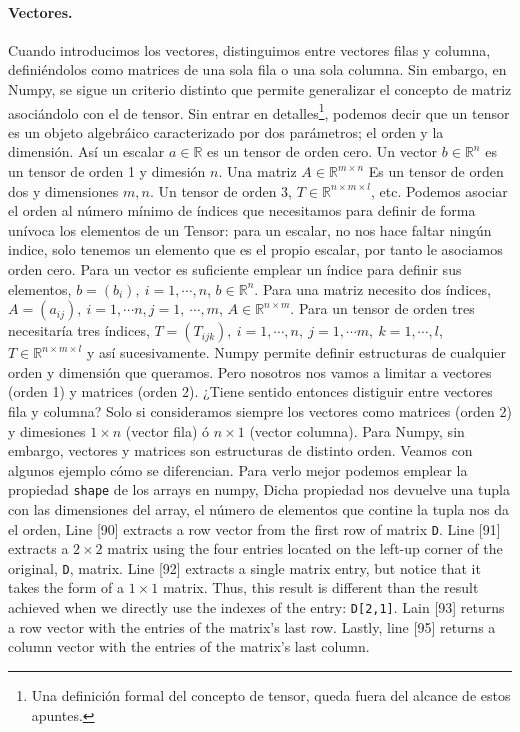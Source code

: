 \begin{paracol}{2}
\paragraph{Vectores.}
Cuando introducimos los vectores, distinguimos entre vectores filas y columna, definiéndolos como matrices de una sola fila o una sola columna. Sin embargo, en Numpy, se sigue un criterio distinto que permite generalizar el concepto de matriz asociándolo con el de tensor. Sin entrar en detalles\footnote{Una definición formal del concepto de tensor, queda fuera del alcance de estos apuntes.}, podemos decir que un tensor es un objeto algebráico caracterizado por dos parámetros; el orden y la dimensión. Así un escalar $a \in \mathbb{R}$ es un tensor de orden cero. Un vector $b \in \mathbb{R}^n$ es un tensor de orden 1 y dimesión $n$. Una matriz $A \in \mathbb{R}^{m\times n}$ Es un tensor de orden dos y dimensiones $m,n$. Un tensor de orden 3, $T \in \mathbb{R}^{n\times m \times l}$, etc. Podemos asociar el orden al número mínimo de índices que necesitamos para definir de forma unívoca los elementos de un Tensor: para un escalar, no nos hace faltar ningún indice, solo tenemos un elemento que es el propio escalar, por tanto le asociamos orden cero. Para un vector es suficiente emplear un índice para definir sus elementos, $b=(b_i),\ i=1,\cdots, n$, $b \in \mathbb{R}^n$. Para una matriz necesito dos índices, $A=(a_{ij}),\ i =1, \cdots n, j = 1,\ \cdots, m$, $A \in \mathbb{R}^{n\times m}$. Para un tensor de orden tres necesitaría tres índices, $T=(T_{ijk}),\ i =1,\cdots, n,\ j =1,\cdots m,\ k = 1,\cdots, l$, $T\in \mathbb{R}^{n\times m \times l}$ y así sucesivamente. Numpy permite definir estructuras de cualquier orden y dimensión que queramos. Pero nosotros nos vamos a limitar a vectores (orden 1) y matrices (orden 2). ¿Tiene sentido entonces distiguir entre vectores fila y columna? Solo si consideramos siempre los vectores como matrices (orden 2) y dimesiones $1\times n$ (vector fila) ó $n \times 1$ (vector columna). Para Numpy, sin embargo, vectores y matrices son estructuras de distinto orden. Veamos con algunos ejemplo cómo se diferencian. Para verlo mejor podemos emplear la propiedad \texttt{shape} de los arrays en numpy, Dicha propiedad nos devuelve una tupla con las dimensiones del array, el número de elementos que contine la tupla nos da el orden,
\switchcolumn
Line [90] extracts a row vector from the first row of matrix \texttt{D}. Line [91] extracts a $2\times 2$ matrix using the four entries located on the left-up corner of the original, \texttt{D}, matrix. Line [92] extracts a single matrix entry, but notice that it takes the form of a $1\times 1$ matrix. Thus, this result is different than the result achieved when we directly use the indexes of the entry: \texttt{D[2,1]}. Lain [93] returns a row vector with the entries of the matrix's last row. Lastly, line [95] returns a column vector with the entries of the matrix's last column.


\end{paracol}
